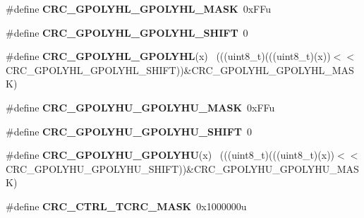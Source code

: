 \begin{DoxyCompactItemize}
\item 
\hypertarget{group___c_r_c___register___masks_ga92b941ef781b6023d61bc2af7f0b1818}{}\#define {\bfseries C\+R\+C\+\_\+\+G\+P\+O\+L\+Y\+H\+L\+\_\+\+G\+P\+O\+L\+Y\+H\+L\+\_\+\+M\+A\+S\+K}~0x\+F\+Fu\label{group___c_r_c___register___masks_ga92b941ef781b6023d61bc2af7f0b1818}

\item 
\hypertarget{group___c_r_c___register___masks_gaffbf0c35e87ea7a9650c9a049a08560c}{}\#define {\bfseries C\+R\+C\+\_\+\+G\+P\+O\+L\+Y\+H\+L\+\_\+\+G\+P\+O\+L\+Y\+H\+L\+\_\+\+S\+H\+I\+F\+T}~0\label{group___c_r_c___register___masks_gaffbf0c35e87ea7a9650c9a049a08560c}

\item 
\hypertarget{group___c_r_c___register___masks_ga21448592fbebb4f7bf7d61d9ecfa80cc}{}\#define {\bfseries C\+R\+C\+\_\+\+G\+P\+O\+L\+Y\+H\+L\+\_\+\+G\+P\+O\+L\+Y\+H\+L}(x)                                  ~(((uint8\+\_\+t)(((uint8\+\_\+t)(x))$<$$<$C\+R\+C\+\_\+\+G\+P\+O\+L\+Y\+H\+L\+\_\+\+G\+P\+O\+L\+Y\+H\+L\+\_\+\+S\+H\+I\+F\+T))\&C\+R\+C\+\_\+\+G\+P\+O\+L\+Y\+H\+L\+\_\+\+G\+P\+O\+L\+Y\+H\+L\+\_\+\+M\+A\+S\+K)\label{group___c_r_c___register___masks_ga21448592fbebb4f7bf7d61d9ecfa80cc}

\item 
\hypertarget{group___c_r_c___register___masks_gac0f3f7a896e1ef279b948d778274cf04}{}\#define {\bfseries C\+R\+C\+\_\+\+G\+P\+O\+L\+Y\+H\+U\+\_\+\+G\+P\+O\+L\+Y\+H\+U\+\_\+\+M\+A\+S\+K}~0x\+F\+Fu\label{group___c_r_c___register___masks_gac0f3f7a896e1ef279b948d778274cf04}

\item 
\hypertarget{group___c_r_c___register___masks_ga448d4b6c4e930f1c84294da6607faac4}{}\#define {\bfseries C\+R\+C\+\_\+\+G\+P\+O\+L\+Y\+H\+U\+\_\+\+G\+P\+O\+L\+Y\+H\+U\+\_\+\+S\+H\+I\+F\+T}~0\label{group___c_r_c___register___masks_ga448d4b6c4e930f1c84294da6607faac4}

\item 
\hypertarget{group___c_r_c___register___masks_gaf6f9af614e9bffe14fbea8a4fe444568}{}\#define {\bfseries C\+R\+C\+\_\+\+G\+P\+O\+L\+Y\+H\+U\+\_\+\+G\+P\+O\+L\+Y\+H\+U}(x)                                  ~(((uint8\+\_\+t)(((uint8\+\_\+t)(x))$<$$<$C\+R\+C\+\_\+\+G\+P\+O\+L\+Y\+H\+U\+\_\+\+G\+P\+O\+L\+Y\+H\+U\+\_\+\+S\+H\+I\+F\+T))\&C\+R\+C\+\_\+\+G\+P\+O\+L\+Y\+H\+U\+\_\+\+G\+P\+O\+L\+Y\+H\+U\+\_\+\+M\+A\+S\+K)\label{group___c_r_c___register___masks_gaf6f9af614e9bffe14fbea8a4fe444568}

\item 
\hypertarget{group___c_r_c___register___masks_gad441a2b8f6300b71038d47cc3c8c0fcc}{}\#define {\bfseries C\+R\+C\+\_\+\+C\+T\+R\+L\+\_\+\+T\+C\+R\+C\+\_\+\+M\+A\+S\+K}~0x1000000u\label{group___c_r_c___register___masks_gad441a2b8f6300b71038d47cc3c8c0fcc}


\end{DoxyCompactItemize}
